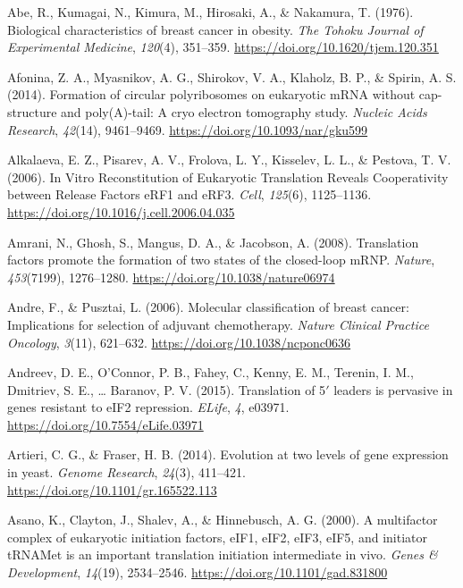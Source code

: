 \documentclass[12pt,openany]{book}
\begin{document}
\hypertarget{refs}{}
\hypertarget{ref-Abe1976}{}
Abe, R., Kumagai, N., Kimura, M., Hirosaki, A., \& Nakamura, T. (1976).
Biological characteristics of breast cancer in obesity. \emph{The Tohoku
Journal of Experimental Medicine}, \emph{120}(4), 351--359.
\url{https://doi.org/10.1620/tjem.120.351}

\hypertarget{ref-Afonina2014}{}
Afonina, Z. A., Myasnikov, A. G., Shirokov, V. A., Klaholz, B. P., \&
Spirin, A. S. (2014). Formation of circular polyribosomes on eukaryotic
mRNA without cap-structure and poly(A)-tail: A cryo electron tomography
study. \emph{Nucleic Acids Research}, \emph{42}(14), 9461--9469.
\url{https://doi.org/10.1093/nar/gku599}

\hypertarget{ref-Alkalaeva2006}{}
Alkalaeva, E. Z., Pisarev, A. V., Frolova, L. Y., Kisselev, L. L., \&
Pestova, T. V. (2006). In Vitro Reconstitution of Eukaryotic Translation
Reveals Cooperativity between Release Factors eRF1 and eRF3.
\emph{Cell}, \emph{125}(6), 1125--1136.
\url{https://doi.org/10.1016/j.cell.2006.04.035}

\hypertarget{ref-Amrani2008}{}
Amrani, N., Ghosh, S., Mangus, D. A., \& Jacobson, A. (2008).
Translation factors promote the formation of two states of the
closed-loop mRNP. \emph{Nature}, \emph{453}(7199), 1276--1280.
\url{https://doi.org/10.1038/nature06974}

\hypertarget{ref-Andre2006}{}
Andre, F., \& Pusztai, L. (2006). Molecular classification of breast
cancer: Implications for selection of adjuvant chemotherapy.
\emph{Nature Clinical Practice Oncology}, \emph{3}(11), 621--632.
\url{https://doi.org/10.1038/ncponc0636}

\hypertarget{ref-Andreev2015}{}
Andreev, D. E., O'Connor, P. B., Fahey, C., Kenny, E. M., Terenin, I.
M., Dmitriev, S. E., \ldots{} Baranov, P. V. (2015). Translation of
5\({'}\) leaders is pervasive in genes resistant to eIF2 repression.
\emph{ELife}, \emph{4}, e03971.
\url{https://doi.org/10.7554/eLife.03971}

\hypertarget{ref-Artieri2014}{}
Artieri, C. G., \& Fraser, H. B. (2014). Evolution at two levels of gene
expression in yeast. \emph{Genome Research}, \emph{24}(3), 411--421.
\url{https://doi.org/10.1101/gr.165522.113}

\hypertarget{ref-Asano2000}{}
Asano, K., Clayton, J., Shalev, A., \& Hinnebusch, A. G. (2000). A
multifactor complex of eukaryotic initiation factors, eIF1, eIF2, eIF3,
eIF5, and initiator tRNAMet is an important translation initiation
intermediate in vivo. \emph{Genes \& Development}, \emph{14}(19),
2534--2546. \url{https://doi.org/10.1101/gad.831800}
\end{document}
